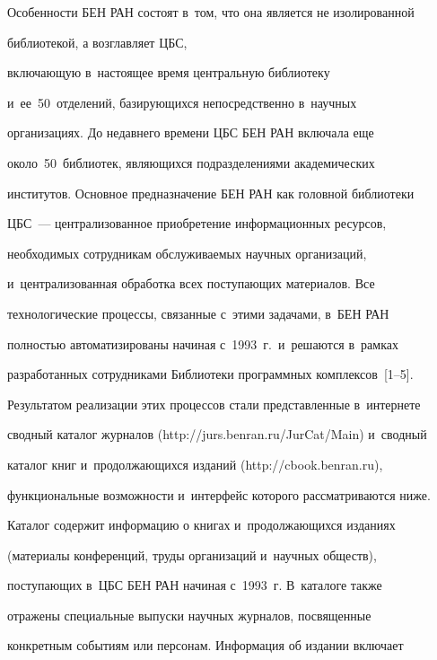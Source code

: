       \thispagestyle{headings}

      

      \vspace*{-6pt} 

  

  Особенности БЕН РАН состоят в~том, что она является не изолированной 

библиотекой, а возглавляет ЦБС, 

включающую в~настоящее время центральную библиотеку 

и~ее~50~отделений, базирующихся непосредственно в~научных 

организациях. До недавнего времени ЦБС БЕН РАН включала еще 

около~50~биб\-лио\-тек, являющихся подразделениями академических 

институтов. Основное предназначение БЕН РАН как головной библиотеки 

ЦБС~--- централизованное приобретение информационных ресурсов, 

необходимых сотрудникам обслуживаемых научных организаций, 

и~централизованная обработка всех поступающих материалов. Все 

технологические процессы, связанные с~этими задачами, в~БЕН РАН 

полностью автоматизированы начиная с~1993~г.\ и~решаются в~рамках 

разработанных сотрудниками Библиотеки программных комплексов~[1--5]. 

Результатом реализации этих процессов стали представленные в~интернете 

сводный каталог журналов ({\small{\sf http://jurs.benran.ru/JurCat/Main}}) и~сводный 

каталог книг и~продолжающихся изданий ({\small{\sf http://cbook.benran.ru}}), 

функциональные возможности и~интерфейс которого рассматриваются ниже. 

  

  Каталог содержит информацию о книгах и~продолжающихся изданиях 

(материалы конференций, труды организаций и~научных обществ), 

поступающих в~ЦБС БЕН РАН начиная с~1993~г. В~каталоге также 

отражены специальные выпуски научных журналов, посвященные 

конкретным событиям или персонам. Информация об издании включает 

